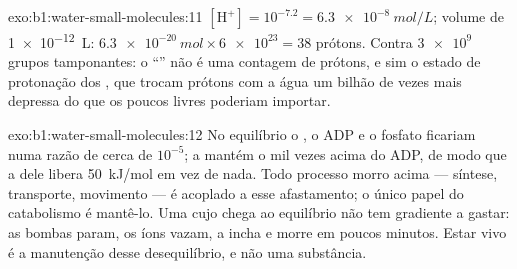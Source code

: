 \begin{solution}{exo:b1:water-small-molecules:11}
$[\mathrm{H^+}] = 10^{-7.2} = \qty{6.3e-8}{mol/L}$; volume de
\qty{1e-12}{L}: $\qty{6.3e-20}{mol}\times\num{6e23} = 38$ prótons.
Contra $\num{3e9}$ grupos tamponantes: o ``'' não é uma contagem de
prótons, e sim o estado de protonação dos , que trocam prótons
com a água um bilhão de vezes mais depressa do que os poucos livres
poderiam importar.
\end{solution}

\begin{solution}{exo:b1:water-small-molecules:12}
No equilíbrio o , o ADP e o fosfato ficariam numa razão de cerca de
$10^{-5}$; a  mantém o  mil vezes acima do ADP, de modo que a
 dele libera \qty{50}{kJ/mol} em vez de nada. Todo processo
morro acima --- síntese, transporte, movimento --- é acoplado a esse
afastamento; o único papel do catabolismo é mantê-lo. Uma  cujo
 chega ao equilíbrio não tem gradiente a gastar: as bombas param, os
íons vazam, a  incha e morre em poucos minutos. Estar vivo é a
manutenção desse desequilíbrio, e não uma substância.
\end{solution}

